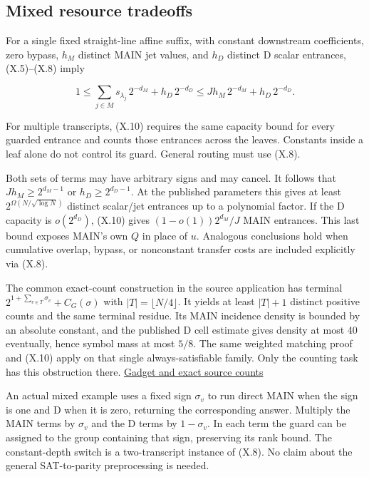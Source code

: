 \documentclass[
  11pt,
]{article}
\begin{document}
\subsection{Mixed resource tradeoffs}\label{mixed-resource-tradeoffs}

For a single fixed straight-line affine suffix, with constant downstream
coefficients, zero bypass, \(h_M\) distinct MAIN jet values, and \(h_D\)
distinct D scalar entrances, (X.5)--(X.8) imply

\[
        1\le \sum_{j\in M}s_{\lambda_j}\,2^{-d_M}
                        +h_D\,2^{-d_D}
          \le J h_M\,2^{-d_M}+h_D\,2^{-d_D}.               \tag{X.10}
\]

For multiple transcripts, (X.10) requires the same capacity bound for
every guarded entrance and counts those entrances across the leaves.
Constants inside a leaf alone do not control its guard. General routing
must use (X.8).

Both sets of terms may have arbitrary signs and may cancel. It follows
that \(J h_M\ge2^{d_M-1}\) or \(h_D\ge2^{d_D-1}\). At the published
parameters this gives at least \(2^{\Omega(N/\sqrt{\log N})}\) distinct
scalar/jet entrances up to a polynomial factor. If the D capacity is
\(o(2^{d_D})\), (X.10) gives \((1-o(1))2^{d_M}/J\) MAIN entrances. This
last bound exposes MAIN's own \(Q\) in place of \(u\). Analogous
conclusions hold when cumulative overlap, bypass, or nonconstant
transfer costs are included explicitly via (X.8).

The common exact-count construction in the source application has
terminal \(2^{1+\sum_{v\in T}\sigma_v}+C_G(\sigma)\) with
\(|T|=\lfloor N/4\rfloor\). It yields at least \(|T|+1\) distinct
positive counts and the same terminal residue. Its MAIN incidence
density is bounded by an absolute constant, and the published D cell
estimate gives density at most 40 eventually, hence symbol mass at most
\(5/8\). The same weighted matching proof and (X.10) apply on that
single always-satisfiable family. Only the counting task has this
obstruction there. \href{https://github.com/dch-and-Elara/some-research-inspired-by-openais-eth-preprint/tree/main/rank-budget-barriers}{Gadget and
exact source counts}

An actual mixed example uses a fixed sign \(\sigma_v\) to run direct
MAIN when the sign is one and D when it is zero, returning the
corresponding answer. Multiply the MAIN terms by \(\sigma_v\) and the D
terms by \(1-\sigma_v\). In each term the guard can be assigned to the
group containing that sign, preserving its rank bound. The
constant-depth switch is a two-transcript instance of (X.8). No claim
about the general SAT-to-parity preprocessing is needed.
\end{document}
